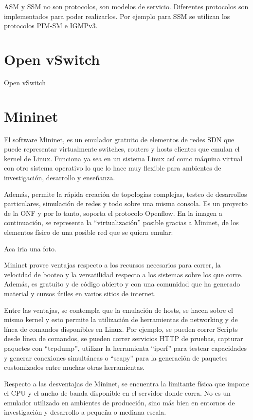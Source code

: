 \documentclass[12pt,a4paper,oneside]{book}
\begin{document}
ASM y SSM no son protocolos, son modelos de servicio. Diferentes protocolos son implementados para poder realizarlos. Por ejemplo para SSM se utilizan los protocolos PIM-SM e IGMPv3.


\section{Open vSwitch}

Open vSwitch

\section{Mininet}

El software Mininet, es un emulador gratuito de elementos de redes SDN que puede representar virtualmente switches, routers y hosts clientes que emulan el kernel de Linux. Funciona  ya sea en un sistema Linux así como máquina virtual con otro sistema operativo lo que lo hace muy flexible para ambientes de investigación, desarrollo y enseñanza.

Además, permite la rápida creación de topologías complejas, testeo de desarrollos particulares, simulación de redes y todo sobre una misma consola. Es un proyecto de la ONF y por lo tanto, soporta el protocolo Openflow. En la imagen a continuación, se representa la “virtualización” posible gracias a Mininet, de los elementos físico de una posible red que se quiera emular:

Aca iria una foto.

Mininet provee ventajas respecto a los recursos necesarios para correr, la velocidad de booteo y la versatilidad respecto a los sistemas sobre los que corre. Además, es gratuito y de código abierto y con una comunidad que ha generado material y cursos útiles en varios sitios de internet.

Entre las ventajas, se contempla que la emulación de hosts, se hacen sobre el mismo kernel y esto permite la utilización de herramientas de networking y de línea de comandos disponibles en Linux. Por ejemplo, se pueden correr Scripts desde línea de comandos, se pueden correr servicios HTTP de pruebas, capturar paquetes con “tcpdump”, utilizar la herramienta “iperf” para testear capacidades y generar conexiones simultáneas o “scapy” para la generación de paquetes customizados entre muchas otras herramientas.

Respecto a las desventajas de Mininet, se encuentra la limitante física que impone el CPU y el ancho de banda disponible en el servidor donde corra. No es un emulador utilizado en ambientes de producción, sino más bien en entornos de investigación y desarrollo a pequeña o mediana escala.
\end{document}
